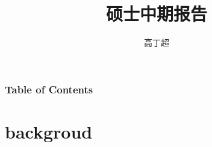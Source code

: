 \documentclass[aspectratio=1610]{beamer}
\title[Mid-term]{硕士中期报告}
\author[Gcc]{高丁超}
\institute[ISCAS]{Institute of Software Chinese Academy of Sciences}
\begin{document}
\begin{frame}[plain]
    \titlepage
\end{frame}

\begin{frame}
    \frametitle{Table of Contents}
    \tableofcontents
\end{frame}
\section{backgroud}
\begin{frame}
    
\end{frame}
\section{} 
\end{document}
